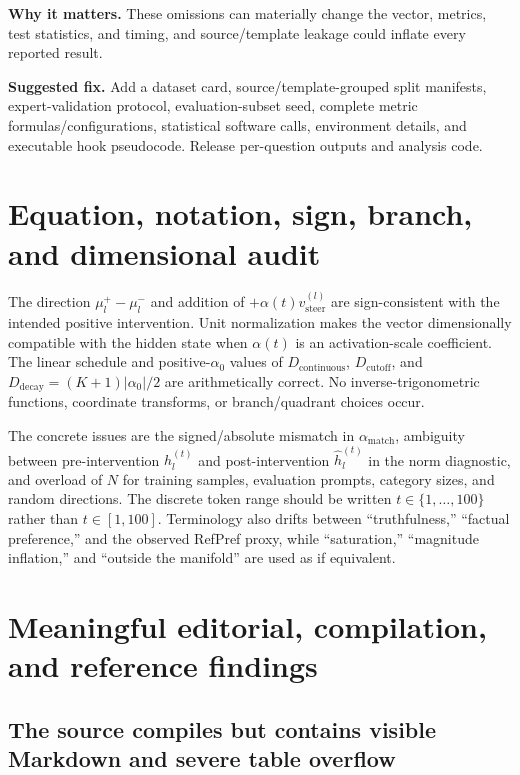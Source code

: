 \documentclass[11pt]{article}
\newcommand{\findinglabel}[1]{\textbf{#1}}
\begin{document}
\findinglabel{Why it matters.} These omissions can materially change the vector, metrics, test statistics, and timing, and source/template leakage could inflate every reported result.

\findinglabel{Suggested fix.} Add a dataset card, source/template-grouped split manifests, expert-validation protocol, evaluation-subset seed, complete metric formulas/configurations, statistical software calls, environment details, and executable hook pseudocode.  Release per-question outputs and analysis code.

\section*{Equation, notation, sign, branch, and dimensional audit}

The direction $\mu_l^+-\mu_l^-$ and addition of $+\alpha(t)v_{\text{steer}}^{(l)}$ are sign-consistent with the intended positive intervention.  Unit normalization makes the vector dimensionally compatible with the hidden state when $\alpha(t)$ is an activation-scale coefficient.  The linear schedule and positive-$\alpha_0$ values of $D_{\text{continuous}}$, $D_{\text{cutoff}}$, and $D_{\text{decay}}=(K+1)|\alpha_0|/2$ are arithmetically correct.  No inverse-trigonometric functions, coordinate transforms, or branch/quadrant choices occur.

The concrete issues are the signed/absolute mismatch in $\alpha_{\text{match}}$, ambiguity between pre-intervention $h_l^{(t)}$ and post-intervention $\hat h_l^{(t)}$ in the norm diagnostic, and overload of $N$ for training samples, evaluation prompts, category sizes, and random directions.  The discrete token range should be written $t\in\{1,\ldots,100\}$ rather than $t\in[1,100]$.  Terminology also drifts between ``truthfulness,'' ``factual preference,'' and the observed RefPref proxy, while ``saturation,'' ``magnitude inflation,'' and ``outside the manifold'' are used as if equivalent.

\section*{Meaningful editorial, compilation, and reference findings}

\subsection*{The source compiles but contains visible Markdown and severe table overflow}
\end{document}
